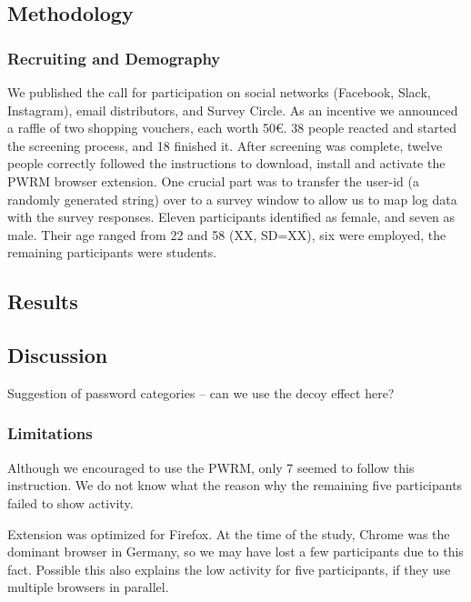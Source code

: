\subsection{Methodology}



\subsubsection{Recruiting and Demography}
We published the call for participation on social networks (Facebook, Slack, Instagram), email distributors, and Survey Circle. As an incentive we announced a raffle of two shopping vouchers, each worth 50€. 38 people reacted and started the screening process, and 18 finished it. After screening was complete, twelve people correctly followed the instructions to download, install and activate the PWRM browser extension. One crucial part was to transfer the user-id (a randomly generated string) over to a survey window to allow us to map log data with the survey responses. Eleven participants identified as female, and seven as male. Their age ranged from 22 and 58 (\average XX, SD=XX), six were employed, the remaining participants were students. 

\subsection{Results}

\subsection{Discussion}
Suggestion of password categories -- can we use the decoy effect here?

\subsubsection{Limitations}

Although we encouraged to use the PWRM, only 7 seemed to follow this instruction. We do not know what the reason why the remaining five participants failed to show activity.

Extension was optimized for Firefox. At the time of the study, Chrome was the dominant browser in Germany, so we may have lost a few participants due to this fact. Possible this also explains the low activity for five participants, if they use multiple browsers in parallel. 


